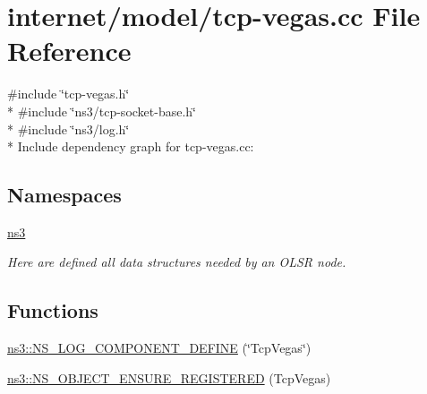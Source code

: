 \hypertarget{tcp-vegas_8cc}{}\section{internet/model/tcp-\/vegas.cc File Reference}
\label{tcp-vegas_8cc}
{\ttfamily \#include \char`\"{}tcp-\/vegas.\+h\char`\"{}}\\*
{\ttfamily \#include \char`\"{}ns3/tcp-\/socket-\/base.\+h\char`\"{}}\\*
{\ttfamily \#include \char`\"{}ns3/log.\+h\char`\"{}}\\*
Include dependency graph for tcp-\/vegas.cc\+:
\subsection*{Namespaces}
\begin{DoxyCompactItemize}
\item 
 \hyperlink{namespacens3}{ns3}
\begin{DoxyCompactList}\small\item\em Here are defined all data structures needed by an O\+L\+SR node. \end{DoxyCompactList}\end{DoxyCompactItemize}
\subsection*{Functions}
\begin{DoxyCompactItemize}
\item 
\hyperlink{namespacens3_a2fba872c7f18b582e2ab29881ba35a26}{ns3\+::\+N\+S\+\_\+\+L\+O\+G\+\_\+\+C\+O\+M\+P\+O\+N\+E\+N\+T\+\_\+\+D\+E\+F\+I\+NE} (\char`\"{}Tcp\+Vegas\char`\"{})
\item 
\hyperlink{namespacens3_a1c50037c39e56c8828eac27563600039}{ns3\+::\+N\+S\+\_\+\+O\+B\+J\+E\+C\+T\+\_\+\+E\+N\+S\+U\+R\+E\+\_\+\+R\+E\+G\+I\+S\+T\+E\+R\+ED} (Tcp\+Vegas)
\end{DoxyCompactItemize}
